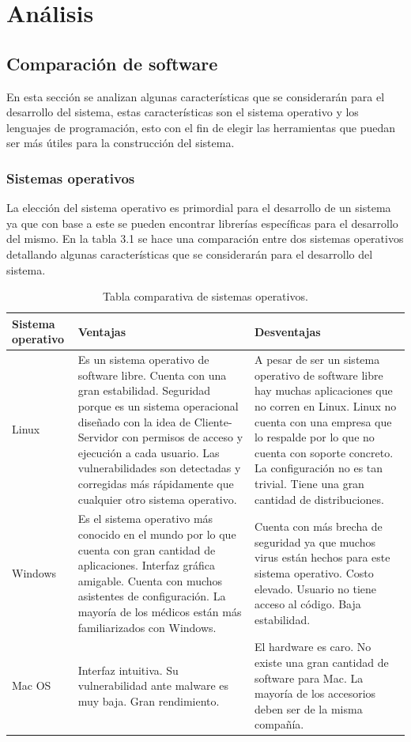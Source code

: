 \documentclass[12pt]{report}
\begin{document}
\chapter{Análisis}
\section{Comparación de software}
En esta sección se analizan algunas características que se considerarán para el desarrollo del sistema, estas características son el sistema operativo y los lenguajes de programación, esto con el fin de elegir las herramientas que puedan ser más útiles para la construcción del sistema.

\subsection{Sistemas operativos}
La elección del sistema operativo es primordial para el desarrollo de un sistema ya que con base a este se pueden encontrar librerías específicas para el desarrollo del mismo. En la tabla 3.1  se hace una comparación entre dos sistemas operativos detallando algunas características que se considerarán para el desarrollo del sistema.

\begin{table}[H]
\begin{center}
\begin{tabular}{|p{25mm}|p{60mm}|p{60mm}|}
\hline
Sistema operativo & Ventajas & Desventajas\\
\hline \hline 
Linux & Es un sistema operativo de software libre. Cuenta con una gran estabilidad. Seguridad porque es un sistema operacional diseñado con la idea de Cliente-Servidor con permisos de acceso y ejecución a cada usuario. Las vulnerabilidades son detectadas y corregidas más rápidamente que cualquier otro sistema operativo.\cite{so} & A pesar de ser un sistema operativo de software libre hay muchas aplicaciones que no corren en Linux. Linux no cuenta con una empresa que lo respalde por lo que no cuenta con soporte concreto. La configuración no es tan trivial.  Tiene una gran cantidad de distribuciones.\cite{so}\\
\hline
Windows & Es el sistema operativo más conocido en el mundo por lo que cuenta con gran cantidad de aplicaciones. Interfaz gráfica amigable. Cuenta con muchos asistentes de configuración. La mayoría de los médicos están más familiarizados con Windows.\cite{so} & Cuenta con más brecha de seguridad ya que muchos virus están hechos para este sistema operativo. Costo elevado. Usuario no tiene acceso al código. Baja estabilidad.\cite{so}\\
\hline
Mac OS & Interfaz intuitiva. Su vulnerabilidad ante malware es muy baja.  Gran rendimiento.\cite{mac} & El hardware es caro. No existe una gran cantidad de software para Mac. La mayoría de los accesorios deben ser de la misma compañía.\cite{mac}\\
\hline
\end{tabular}
\caption{Tabla comparativa de sistemas operativos.}
\end{center}
\end{table}
\end{document}
